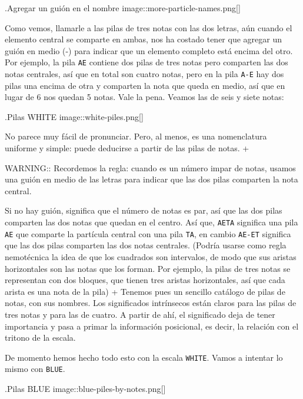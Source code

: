 \documentclass[]{article}
\begin{document}
.Agregar un guión en el nombre image::more-particle-names.png{[}{]}

Como vemos, llamarle a las pilas de tres notas con las dos letras, aún cuando el elemento central se comparte en ambas, nos ha costado tener que agregar un guión en medio (-) para indicar que un elemento completo está encima del otro. Por ejemplo, la pila \texttt{AE} contiene dos pilas de tres notas pero comparten las dos notas centrales, así que en total son cuatro notas, pero en la pila \texttt{A-E} hay dos pilas una encima de otra y comparten la nota que queda en medio, así que en lugar de 6 nos quedan 5 notas. Vale la pena. Veamos las de seis y siete notas:

.Pilas WHITE image::white-piles.png{[}{]}

No parece muy fácil de pronunciar. Pero, al menos, es una nomenclatura uniforme y simple: puede deducirse a partir de las pilas de notas. +

WARNING:: Recordemos la regla: cuando es un número impar de notas, usamos una guión en medio de las letras para indicar que las dos pilas comparten la nota central.

Si no hay guión, significa que el número de notas es par, así que las dos pilas comparten las dos notas que quedan en el centro. Así que, \texttt{AETA} significa una pila \texttt{AE} que comparte la partícula central con una pila \texttt{TA}, en cambio \texttt{AE-ET} significa que las dos pilas comparten las dos notas centrales. (Podría usarse como regla nemotécnica la idea de que los cuadrados son intervalos, de modo que sus aristas horizontales son las notas que los forman. Por ejemplo, la pilas de tres notas se representan con dos bloques, que tienen tres aristas horizontales, así que cada arista es una nota de la pila) + Tenemos pues un sencillo catálogo de pilas de notas, con sus nombres. Los significados intrínsecos están claros para las pilas de tres notas y para las de cuatro. A partir de ahí, el significado deja de tener importancia y pasa a primar la información posicional, es decir, la relación con el tritono de la escala.

De momento hemos hecho todo esto con la escala \texttt{WHITE}. Vamos a intentar lo mismo con \texttt{BLUE}.

.Pilas BLUE image::blue-piles-by-notes.png{[}{]}
\end{document}
